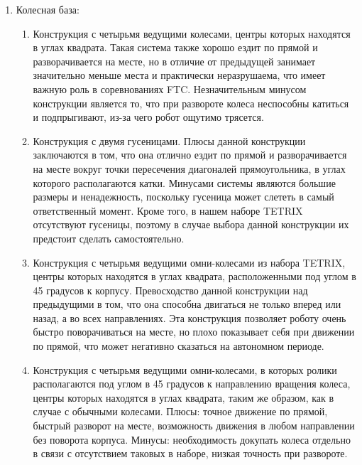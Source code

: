 \begin{enumerate}
\begin{enumerate}
\begin{enumerate}
\begin{enumerate}
	    \end{enumerate}
	    
	    \item Колесная база:\newline
	    \begin{enumerate}
	      \item Конструкция с четырьмя ведущими колесами, центры которых находятся в углах квадрата. Такая система также хорошо ездит по прямой и разворачивается на месте, но в отличие от предыдущей занимает значительно меньше места и практически неразрушаема, что имеет важную роль в соревнованиях FTC. Незначительным минусом конструкции является то, что при развороте колеса неспособны катиться и подпрыгивают, из-за чего робот ощутимо трясется.\newline	
	      
	      \item Конструкция с двумя гусеницами. Плюсы данной конструкции заключаются в том, что она отлично ездит по прямой  и разворачивается на месте вокруг точки пересечения диагоналей прямоугольника, в углах которого располагаются катки. Минусами системы являются большие размеры и ненадежность, поскольку гусеница может слететь в самый ответственный момент. Кроме того, в нашем наборе TETRIX отсутствуют гусеницы, поэтому в случае выбора данной конструкции их предстоит сделать самостоятельно.\newline
	      
	      \item Конструкция с четырьмя ведущими омни-колесами из набора TETRIX, центры которых находятся в углах квадрата, расположенными под углом в 45 градусов к корпусу. Превосходство данной конструкции над предыдущими в том, что она способна двигаться не только вперед или назад, а во всех направлениях. Эта конструкция позволяет роботу очень быстро поворачиваться на месте, но плохо показывает себя при движении по прямой, что может негативно сказаться на автономном периоде.\newline
	      
	      \item Конструкция с четырьмя ведущими омни-колесами, в которых ролики располагаются под углом в 45 градусов к направлению вращения колеса, центры которых находятся в углах квадрата, таким же образом, как в случае с обычными колесами. Плюсы: точное движение по прямой, быстрый разворот на месте, возможность движения в любом направлении без поворота корпуса. Минусы: необходимость докупать колеса отдельно в связи с отсутствием таковых в наборе, низкая точность при развороте.\newline
	      

\end{enumerate}
\end{enumerate}
\end{enumerate}
\end{enumerate}
